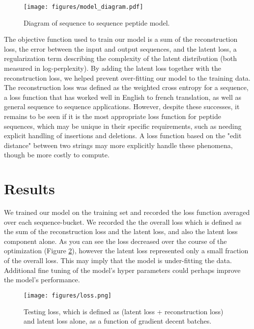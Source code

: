 \documentclass[final,1p,times,twocolumn]{elsarticle}
\begin{document}
\begin{figure}[h]
  \centering
  \texttt{[image: figures/model\_diagram.pdf]}
  \caption{Diagram of sequence to sequence peptide model.}
  \label{model_diagram}
\end{figure}

The objective function used to train our model is a sum of the reconstruction loss, the error between the input and output sequences, and the latent loss, a regularization term describing the complexity of the latent distribution (both measured in log-perplexity). By adding the latent loss together with the reconstruction loss, we helped prevent over-fitting our model to the training data. The reconstruction loss was defined as the weighted cross entropy for a sequence, a loss function that has worked well in English to french translation, as well as general sequence to sequence applications\cite{vinyals2015grammar}. However, despite these successes, it remains to be seen if it is the most appropriate loss function for peptide sequences, which may be unique in their specific requirements, such as needing explicit handling of insertions and deletions. A loss function based on the "edit distance" between two strings may more explicitly handle these phenomena, though be more costly to compute.

\section{Results}

We trained our model on the training set and recorded the loss function averaged over each sequence-bucket. We recorded the the overall loss which is defined as the sum of the reconstruction loss and the latent loss, and also the latent loss component alone. As you can see the loss decreased over the course of the optimization (Figure \ref{loss}), however the latent loss represented only a small fraction of the overall loss. This may imply that the model is under-fitting the data. Additional fine tuning of the model's hyper parameters could perhaps improve the model's performance.

\begin{figure}[h]
  \centering
  \texttt{[image: figures/loss.png]}
  \caption{Testing loss, which is defined as (latent loss + reconstruction loss) and latent loss alone, as a function of gradient decent batches.}
  \label{loss}
\end{figure}
\end{document}
